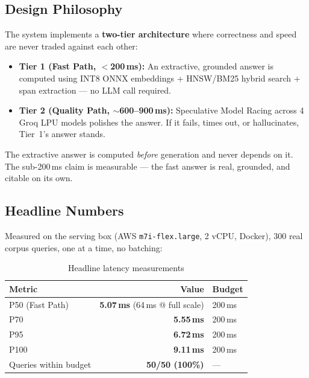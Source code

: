 \documentclass[12pt,a4paper]{article}
\begin{document}
\subsection{Design Philosophy}

The system implements a \textbf{two-tier architecture} where correctness and speed are never traded against each other:

\begin{itemize}
    \item \textbf{Tier 1 (Fast Path, $<$200\,ms):} An extractive, grounded answer is computed using INT8 ONNX embeddings + HNSW/BM25 hybrid search + span extraction --- no LLM call required.
    \item \textbf{Tier 2 (Quality Path, $\sim$600--900\,ms):} Speculative Model Racing across 4 Groq LPU models polishes the answer. If it fails, times out, or hallucinates, Tier~1's answer stands.
\end{itemize}

\begin{importantbox}
The extractive answer is computed \textit{before} generation and never depends on it. The sub-200\,ms claim is measurable --- the fast answer is real, grounded, and citable on its own.
\end{importantbox}

\subsection{Headline Numbers}

Measured on the serving box (AWS \texttt{m7i-flex.large}, 2 vCPU, Docker), 300 real corpus queries, one at a time, no batching:

\begin{table}[H]
\centering
\begin{tabular}{lrl}
\toprule
\textbf{Metric} & \textbf{Value} & \textbf{Budget} \\
\midrule
P50 (Fast Path)  & \textbf{5.07\,ms} (64\,ms @ full scale) & 200\,ms \\
P70              & \textbf{5.55\,ms}  & 200\,ms \\
P95              & \textbf{6.72\,ms}  & 200\,ms \\
P100             & \textbf{9.11\,ms}  & 200\,ms \\
Queries within budget & \textbf{50/50 (100\%)} & --- \\
\bottomrule
\end{tabular}
\caption{Headline latency measurements}
\end{table}
\end{document}
